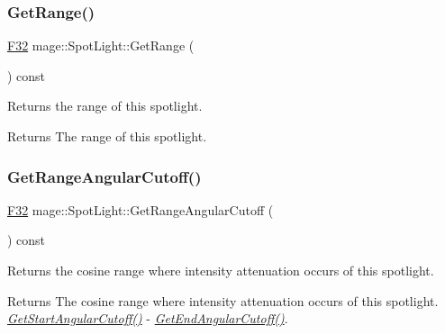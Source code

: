 \subsubsection{\texorpdfstring{Get\+Range()}{GetRange()}}
{\footnotesize\ttfamily \hyperlink{namespacemage_aa97e833b45f06d60a0a9c4fc22ae02c0}{F32} mage\+::\+Spot\+Light\+::\+Get\+Range (\begin{DoxyParamCaption}{ }\end{DoxyParamCaption}) const\hspace{0.3cm}{\ttfamily [noexcept]}}

Returns the range of this spotlight.

\begin{DoxyReturn}{Returns}
The range of this spotlight. 
\end{DoxyReturn}
\hypertarget{classmage_1_1_spot_light_ada7b32eb18cc2bb6707a62c4ab72f4f2}{}\label{classmage_1_1_spot_light_ada7b32eb18cc2bb6707a62c4ab72f4f2} 
\subsubsection{\texorpdfstring{Get\+Range\+Angular\+Cutoff()}{GetRangeAngularCutoff()}}
{\footnotesize\ttfamily \hyperlink{namespacemage_aa97e833b45f06d60a0a9c4fc22ae02c0}{F32} mage\+::\+Spot\+Light\+::\+Get\+Range\+Angular\+Cutoff (\begin{DoxyParamCaption}{ }\end{DoxyParamCaption}) const\hspace{0.3cm}{\ttfamily [noexcept]}}

Returns the cosine range where intensity attenuation occurs of this spotlight.

\begin{DoxyReturn}{Returns}
The cosine range where intensity attenuation occurs of this spotlight. {\itshape \hyperlink{classmage_1_1_spot_light_a649e84aaf1f98c605f14d9597241df72}{Get\+Start\+Angular\+Cutoff()}} -\/ {\itshape \hyperlink{classmage_1_1_spot_light_ad9c4cabf950619605a8040e41b9acb5b}{Get\+End\+Angular\+Cutoff()}}. 
\end{DoxyReturn}
\hypertarget{classmage_1_1_spot_light_a649e84aaf1f98c605f14d9597241df72}{}\label{classmage_1_1_spot_light_a649e84aaf1f98c605f14d9597241df72} 
